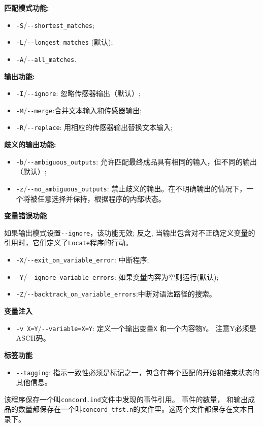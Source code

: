 \bigskip
\noindent \textbf{匹配模式功能:}
\begin{itemize}
  \item \verb+-S+/\verb+--shortest_matches+;
  \item \verb+-L+/\verb+--longest_matches+ (默认);
  \item \verb+-A+/\verb+--all_matches+.
\end{itemize}

\bigskip
\noindent \textbf{输出功能:}
\begin{itemize}
  \item \verb+-I+/\verb+--ignore+: 忽略传感器输出（默认）;
  \item \verb+-M+/\verb+--merge+:合并文本输入和传感器输出;
  \item \verb+-R+/\verb+--replace+: 用相应的传感器输出替换文本输入;
\end{itemize}

\bigskip
\noindent \textbf{歧义的输出功能:}
\begin{itemize}
  \item \verb+-b+/\verb+--ambiguous_outputs+: 允许匹配最终成品具有相同的输入，但不同的输出（默认）;
  \item \verb+-z+/\verb+--no_ambiguous_outputs+: 禁止歧义的输出。在不明确输出的情况下，一个将被任意选择并保持，根据程序的内部状态。
\end{itemize}

\bigskip
\noindent \textbf{变量错误功能}

\noindent 如果输出模式设置\verb+--ignore+，该功能无效; 反之, 当输出包含对不正确定义变量的引用时，它们定义了\verb+Locate+程序的行动。
\begin{itemize}
\item \verb+-X+/\verb+--exit_on_variable_error+: 中断程序;
\item \verb+-Y+/\verb+--ignore_variable_errors+: 如果变量内容为空则运行(默认);
\item \verb+-Z+/\verb+--backtrack_on_variable_errors+:中断对语法路径的搜索。
\end{itemize}
\noindent \textbf{变量注入}
\begin{itemize}
\item \verb+-v X=Y+/\verb+--variable=X=Y+: 定义一个输出变量\verb+X+ 和一个内容物\verb+Y+。 
  注意Y必须是ASCII码。
\end{itemize}
\noindent \textbf{标签功能}
\begin{itemize}
\item \verb+--tagging+: 指示一致性必须是标记之一，包含在每个匹配的开始和结束状态的其他信息。
\end{itemize}
\bigskip
\noindent {}
该程序保存一个叫\verb+concord.ind+文件中发现的事件引用。
事件的数量， 和输出成品的数量都保存在一个叫\verb+concord_tfst.n+的文件里。这两个文件都保存在文本目录下。







